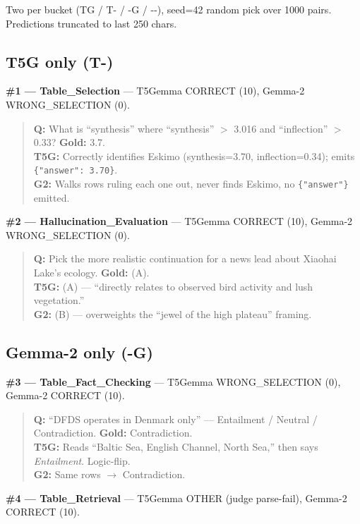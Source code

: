 \documentclass[11pt]{article}
\begin{document}
Two per bucket (TG / T-{} / -G / -{}-), seed=42 random pick over 1000
pairs. Predictions truncated to last 250 chars.

\subsection*{T5G only (T-)}

\textbf{\#1 --- Table\_Selection} --- T5Gemma CORRECT (10), Gemma-2 WRONG\_SELECTION (0).

\begin{quote}
\textbf{Q:} What is ``synthesis'' where ``synthesis'' $>$ 3.016 and ``inflection'' $>$ 0.33? \textbf{Gold:} 3.7.\\
\textbf{T5G:} Correctly identifies Eskimo (synthesis=3.70, inflection=0.34); emits \texttt{\{"answer": 3.70\}}.\\
\textbf{G2:} Walks rows ruling each one out, never finds Eskimo, no \texttt{\{"answer"\}} emitted.
\end{quote}

\textbf{\#2 --- Hallucination\_Evaluation} --- T5Gemma CORRECT (10), Gemma-2 WRONG\_SELECTION (0).

\begin{quote}
\textbf{Q:} Pick the more realistic continuation for a news lead about Xiaohai Lake's ecology. \textbf{Gold:} (A).\\
\textbf{T5G:} (A) --- ``directly relates to observed bird activity and lush vegetation.''\\
\textbf{G2:} (B) --- overweights the ``jewel of the high plateau'' framing.
\end{quote}

\subsection*{Gemma-2 only (-G)}

\textbf{\#3 --- Table\_Fact\_Checking} --- T5Gemma WRONG\_SELECTION (0), Gemma-2 CORRECT (10).

\begin{quote}
\textbf{Q:} ``DFDS operates in Denmark only'' --- Entailment / Neutral / Contradiction. \textbf{Gold:} Contradiction.\\
\textbf{T5G:} Reads ``Baltic Sea, English Channel, North Sea,'' then says \emph{Entailment}. Logic-flip.\\
\textbf{G2:} Same rows $\to$ Contradiction.
\end{quote}

\textbf{\#4 --- Table\_Retrieval} --- T5Gemma OTHER (judge parse-fail), Gemma-2 CORRECT (10).
\end{document}
